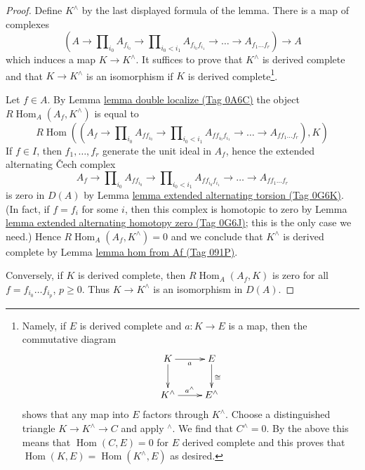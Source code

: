 \documentclass{amsart}
\theoremstyle{plain}
\theoremstyle{definition}
\theoremstyle{remark}
\numberwithin{equation}{subsection}
\def\Hom{\mathop{\mathrm{Hom}}\nolimits}
\begin{document}
\begin{proof}
Define $K^\wedge$ by the last displayed formula of the lemma.
There is a map of complexes
$$
(A \to \prod\nolimits_{i_0} A_{f_{i_0}} \to
\prod\nolimits_{i_0 < i_1} A_{f_{i_0}f_{i_1}} \to
\ldots \to A_{f_1\ldots f_r}) \longrightarrow A
$$
which induces a map $K \to K^\wedge$. It suffices to prove that
$K^\wedge$ is derived complete and that $K \to K^\wedge$ is an
isomorphism if $K$ is derived complete\footnote{Namely, if $E$
is derived complete and $a : K \to E$ is a map, then the
commutative diagram
$$
\xymatrix{
K \ar[r]_a \ar[d] & E \ar[d]^{\cong} \\
K^\wedge \ar[r]^{a^\wedge} & E^\wedge
}
$$
shows that any map into $E$ factors through $K^\wedge$.
Choose a distinguished triangle $K \to K^\wedge \to C$ and apply
${}^\wedge$. We find that $C^\wedge = 0$.
By the above this means that $\Hom(C, E) = 0$ for $E$ derived complete
and this proves that $\Hom(K, E) = \Hom(K^\wedge, E)$ as desired.}.

\medskip\noindent
Let $f \in A$. By Lemma \href{https://stacks.math.columbia.edu/tag/0A6C}{lemma double localize (Tag 0A6C)}
the object $R\Hom_A(A_f, K^\wedge)$ is equal to
$$
R\Hom\left((A_f \to \prod\nolimits_{i_0} A_{ff_{i_0}} \to
\prod\nolimits_{i_0 < i_1} A_{ff_{i_0}f_{i_1}} \to
\ldots \to A_{ff_1\ldots f_r}), K\right)
$$
If $f \in I$, then $f_1, \ldots, f_r$ generate the
unit ideal in $A_f$, hence the extended alternating
{\v C}ech complex
$$
A_f \to \prod\nolimits_{i_0} A_{ff_{i_0}} \to
\prod\nolimits_{i_0 < i_1} A_{ff_{i_0}f_{i_1}} \to
\ldots \to A_{ff_1\ldots f_r}
$$
is zero in $D(A)$ by
Lemma \href{https://stacks.math.columbia.edu/tag/0G6K}{lemma extended alternating torsion (Tag 0G6K)}.
(In fact, if $f = f_i$ for some $i$, then this complex
is homotopic to zero by
Lemma \href{https://stacks.math.columbia.edu/tag/0G6J}{lemma extended alternating homotopy zero (Tag 0G6J)};
this is the only case we need.)
Hence $R\Hom_A(A_f, K^\wedge) = 0$ and we conclude that
$K^\wedge$ is derived complete by Lemma \href{https://stacks.math.columbia.edu/tag/091P}{lemma hom from Af (Tag 091P)}.

\medskip\noindent
Conversely, if $K$ is derived complete, then $R\Hom_A(A_f, K)$
is zero for all $f = f_{i_0} \ldots f_{i_p}$, $p \geq 0$. Thus
$K \to K^\wedge$ is an isomorphism in $D(A)$.
\end{proof}
\end{document}
